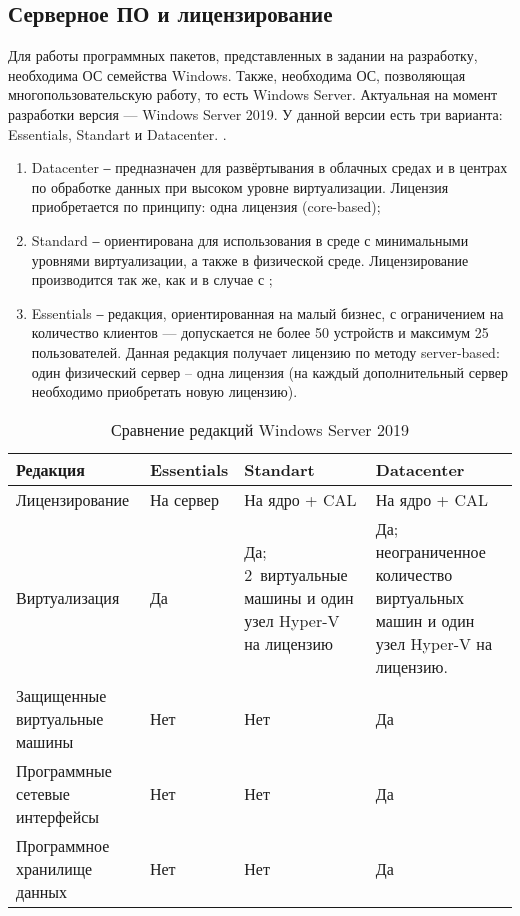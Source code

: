 \subsection{Серверное ПО и лицензирование}

Для работы программных пакетов, представленных в задании на разработку, необходима ОС
семейства Windows. Также, необходима ОС, позволяющая многопользовательскую работу, то
есть Windows Server. Актуальная на момент разработки версия — Windows Server 2019. У
данной версии есть три варианта: Essentials, Standart и Datacenter.
\cite{ref:win_srv_overview}\cite{ref:win_srv_comp}.

\begin{enumerate}
    \item Datacenter ‒ предназначен для развёртывания в облачных средах и в центрах по
        обработке данных при высоком уровне виртуализации. Лицензия приобретается по
        принципу: одна лицензия  (core-based);
    \item Standard ‒ ориентирована для использования в среде с минимальными уровнями
        виртуализации, а также в физической среде. Лицензирование производится так же,
        как и в случае с ;
    \item Essentials ‒ редакция, ориентированная на малый бизнес, с ограничением на
        количество клиентов — допускается не более 50 устройств и максимум 25
        пользователей. Данная редакция получает лицензию по методу server-based:
        один физический сервер – одна лицензия (на каждый дополнительный сервер
        необходимо приобретать новую лицензию).
\end{enumerate}

\begin{table}[h]
    \centering
    \caption{Сравнение редакций Windows Server 2019}
    \label{tab:win_srv_comp}
    \begin{tabu}to \linewidth{X[1,c,m]X[1,c,m]X[1,c,m]X[1,c,m]}
        \toprule
        Редакция & Essentials & Standart & Datacenter \\
        \midrule
        Лицензирование & На сервер & На ядро + CAL & На ядро + CAL \\
        Виртуализация & Да & Да; 2~виртуальные
        машины и один узел Hyper-V на лицензию & Да; неограниченное количество
        виртуальных машин и один узел Hyper-V на лицензию. \\
        Защищенные виртуальные машины & Нет & Нет & Да \\
        Программные сетевые интерфейсы & Нет & Нет & Да \\
        Программное хранилище данных & Нет & Нет & Да \\
        \bottomrule
    \end{tabu}
\end{table}

